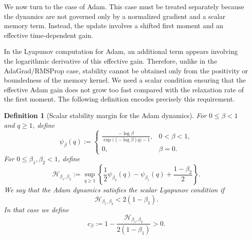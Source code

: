 \documentclass{article} %
\newtheorem{definition}{Definition}
\begin{document}
We now turn to the case of Adam. This case must be treated separately because the dynamics are not governed only by a normalized gradient and a scalar memory term. Instead, the update involves a shifted first moment and an effective time-dependent gain.

In the Lyapunov computation for Adam, an additional term appears involving the logarithmic derivative of this effective gain. Therefore, unlike in the AdaGrad/RMSProp case, stability cannot be obtained only from the positivity or boundedness of the memory kernel. We need a scalar condition ensuring that the effective Adam gain does not grow too fast compared with the relaxation rate of the first moment. The following definition encodes precisely this requirement.

\begin{definition}[Scalar stability margin for the Adam dynamics]
\label{def:adam_scalar_margin}
For \(0\leq \beta<1\) and \(q\geq1\), define
\[
    \psi_\beta(q)
    :=
    \begin{cases}
    \displaystyle
    \frac{-\log\beta}{\exp\bigl((-\log\beta)q\bigr)-1},
    & 0<\beta<1,\\[1.2em]
    0,
    & \beta=0.
    \end{cases}
\]
For \(0\leq\beta_1,\beta_2<1\), define
\begin{equation}\label{eq:H_beta_def}
    \mathcal H_{\beta_1,\beta_2}
    :=
    \sup_{q\geq1}
    \left\{
        \frac12\psi_{\beta_2}(q)
        -
        \psi_{\beta_1}(q)
        +
        \frac{1-\beta_2}{2}
    \right\}.
\end{equation}
We say that the Adam dynamics satisfies the scalar Lyapunov condition if
\begin{equation}\label{eq:natural_scalar_condition}
    \mathcal H_{\beta_1,\beta_2}
    <
    2(1-\beta_1).
\end{equation}
In that case we define
\begin{equation}\label{eq:c_beta_def}
    c_\beta
    :=
    1-
    \frac{\mathcal H_{\beta_1,\beta_2}}
    {2(1-\beta_1)}
    >0.
\end{equation}
\end{definition}
\end{document}
